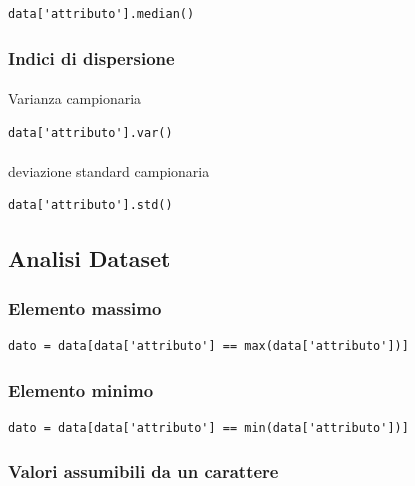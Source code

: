 \documentclass{article}
\begin{document}
\begin{lstlisting}
data['attributo'].median()
\end{lstlisting}

\subsubsection*{Indici di dispersione}

\paragraph{}{Varianza campionaria}

\begin{lstlisting}
data['attributo'].var()
\end{lstlisting}

\paragraph{}{deviazione standard campionaria}

\begin{lstlisting}
data['attributo'].std()
\end{lstlisting}

\subsection*{Analisi Dataset}

\subsubsection*{Elemento massimo}

\begin{lstlisting}
dato = data[data['attributo'] == max(data['attributo'])]
\end{lstlisting}

\subsubsection*{Elemento minimo}

\begin{lstlisting}
dato = data[data['attributo'] == min(data['attributo'])]
\end{lstlisting}

\subsubsection*{Valori assumibili da un carattere}
\end{document}
